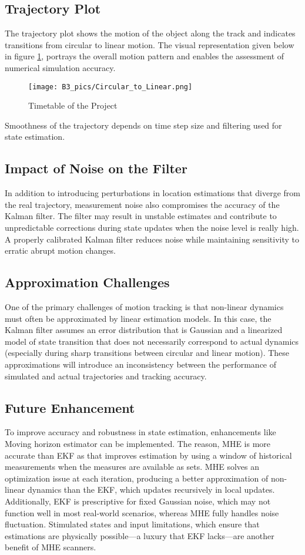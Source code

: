\documentclass[a4paper,11pt]{article}
\begin{document}
\subsection*{Trajectory Plot}
The trajectory plot shows the motion of the object along the track and indicates transitions from circular to linear motion. The visual representation given below in figure \ref{fig:1}, portrays the overall motion pattern and enables the assessment of numerical simulation accuracy. 
\begin{figure} [H]
    \centering
    \texttt{[image: B3\_pics/Circular\_to\_Linear.png]}
    \caption{Timetable of the Project}
    \label{fig:1}
\end{figure}
Smoothness of the trajectory depends on time step size and filtering used for state estimation. 

\subsection*{Impact of Noise on the Filter}
In addition to introducing perturbations in location estimations that diverge from the real trajectory, measurement noise also compromises the accuracy of the Kalman filter. The filter may result in unstable estimates and contribute to unpredictable corrections during state updates when the noise level is really high. A properly calibrated Kalman filter reduces noise while maintaining sensitivity to erratic abrupt motion changes.

\subsection*{Approximation Challenges}
One of the primary challenges of motion tracking is that non-linear dynamics must often be approximated by linear estimation models. In this case, the Kalman filter assumes an error distribution that is Gaussian and a linearized model of state transition that does not necessarily correspond to actual dynamics (especially during sharp transitions between circular and linear motion). These approximations will introduce an inconsistency between the performance of simulated and actual trajectories and tracking accuracy. 

\subsection*{Future Enhancement}
To improve accuracy and robustness in state estimation, enhancements like Moving horizon estimator can be implemented. The reason, MHE is more accurate than EKF as that improves estimation by using a window of historical measurements when the measures are available as sets. MHE solves an optimization issue at each iteration, producing a better approximation of non-linear dynamics than the EKF, which updates recursively in local updates. Additionally, EKF is prescriptive for fixed Gaussian noise, which may not function well in most real-world scenarios, whereas MHE fully handles noise fluctuation. Stimulated states and input limitations, which ensure that estimations are physically possible—a luxury that EKF lacks—are another benefit of MHE scanners. 
\end{document}
